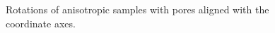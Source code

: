 \documentclass[reprint,amsmath,amssymb,aps,pre,showkeys,showpacs]{revtex4-1}
\begin{document}
\begin{figure}[tp]
  \centering
  \hfill
  \caption[]{Rotations of anisotropic samples with pores aligned with the
    coordinate axes.}
  \label{fig:samples-rot}
\end{figure}
\end{document}
